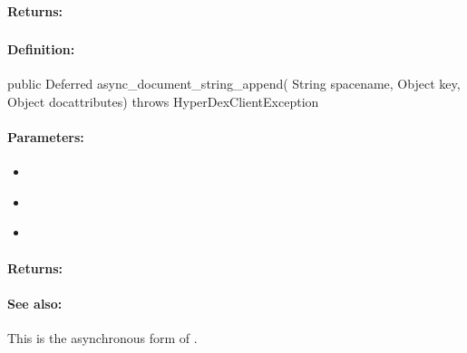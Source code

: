 \paragraph{Returns:}


\pagebreak
\subsubsection{}
\label{api:java:async_document_string_append}


\paragraph{Definition:}
\begin{javacode}
public Deferred async_document_string_append(
        String spacename,
        Object key,
        Object docattributes) throws HyperDexClientException
\end{javacode}

\paragraph{Parameters:}
\begin{itemize}[noitemsep]
\item {}\\

\item {}\\

\item {}\\

\end{itemize}

\paragraph{Returns:}


\paragraph{See also:}  This is the asynchronous form of .

